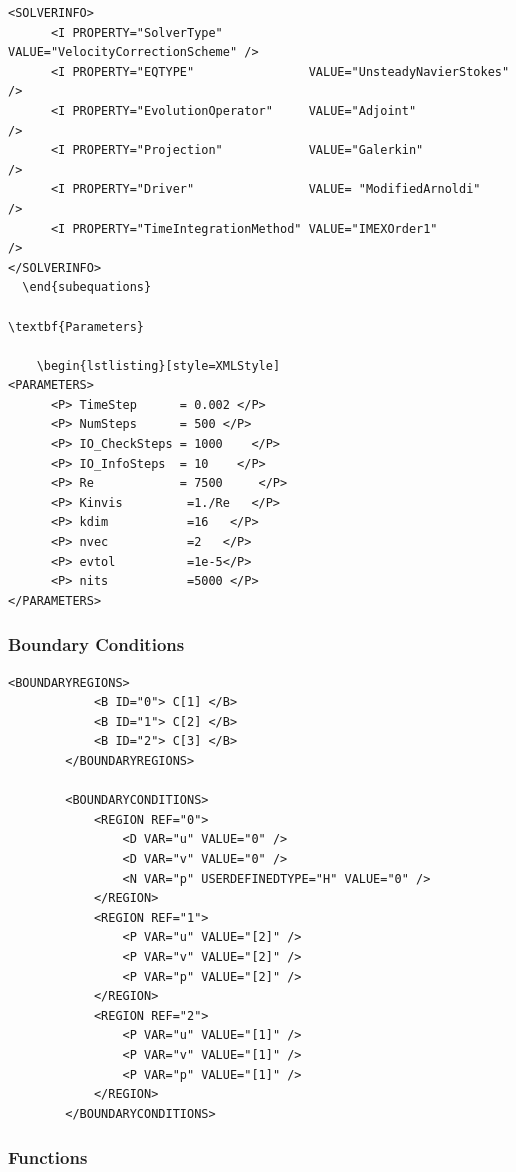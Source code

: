     \begin{lstlisting}[style=XMLStyle]
<SOLVERINFO>
      <I PROPERTY="SolverType"            VALUE="VelocityCorrectionScheme" />
      <I PROPERTY="EQTYPE"                VALUE="UnsteadyNavierStokes"     />
      <I PROPERTY="EvolutionOperator"     VALUE="Adjoint"                  />
      <I PROPERTY="Projection"            VALUE="Galerkin"                 />
      <I PROPERTY="Driver"                VALUE= "ModifiedArnoldi"         />
      <I PROPERTY="TimeIntegrationMethod" VALUE="IMEXOrder1"               />
</SOLVERINFO>
  \end{subequations}

\textbf{Parameters}

    \begin{lstlisting}[style=XMLStyle]
<PARAMETERS>
      <P> TimeStep      = 0.002 </P>
      <P> NumSteps      = 500 </P>
      <P> IO_CheckSteps = 1000    </P>
      <P> IO_InfoSteps  = 10    </P>
      <P> Re            = 7500     </P>
      <P> Kinvis         =1./Re   </P>
      <P> kdim           =16   </P>
      <P> nvec           =2   </P>
      <P> evtol          =1e-5</P>
      <P> nits           =5000 </P>
</PARAMETERS>
  \end{lstlisting}

\subsubsection{Boundary Conditions}

    \begin{lstlisting}[style=XMLStyle]
 <BOUNDARYREGIONS>
            <B ID="0"> C[1] </B>
            <B ID="1"> C[2] </B>
            <B ID="2"> C[3] </B>
        </BOUNDARYREGIONS>

        <BOUNDARYCONDITIONS>
            <REGION REF="0">
                <D VAR="u" VALUE="0" />
                <D VAR="v" VALUE="0" />
                <N VAR="p" USERDEFINEDTYPE="H" VALUE="0" />
            </REGION>
            <REGION REF="1">
                <P VAR="u" VALUE="[2]" />
                <P VAR="v" VALUE="[2]" />
                <P VAR="p" VALUE="[2]" />
            </REGION>
            <REGION REF="2">
                <P VAR="u" VALUE="[1]" />
                <P VAR="v" VALUE="[1]" />
                <P VAR="p" VALUE="[1]" />
            </REGION>
        </BOUNDARYCONDITIONS>
  \end{lstlisting}


\subsubsection{Functions}

